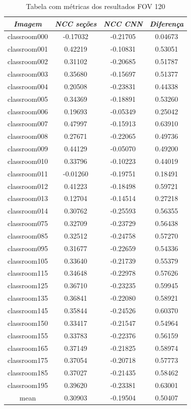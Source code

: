 \documentclass[cic,tc]{iiufrgs}
\begin{document}
\begin{table}[h]
    \caption{Tabela com métricas dos resultados FOV 120\degree}
    \centering
        \begin{tabular}{c|c|c|c}
          \hline
          \textit{Imagem} & \textit{NCC seções} & \textit{NCC CNN} & \textit{Diferença} \\
          \hline
          \hline
          classroom000 & -0.17032 & -0.21705 & 0.04673 \\
          classroom001 & 0.42219 & -0.10831 & 0.53051 \\
          classroom002 & 0.31102 & -0.20685 & 0.51787 \\
          classroom003 & 0.35680 & -0.15697 & 0.51377 \\
          classroom004 & 0.20508 & -0.23831 & 0.44338 \\
          classroom005 & 0.34369 & -0.18891 & 0.53260 \\
          classroom006 & 0.19693 & -0.05349 & 0.25042 \\
          classroom007 & 0.47997 & -0.15913 & 0.63910 \\
          classroom008 & 0.27671 & -0.22065 & 0.49736 \\
          classroom009 & 0.44129 & -0.05070 & 0.49200 \\
          classroom010 & 0.33796 & -0.10223 & 0.44019 \\
          classroom011 & -0.01260 & -0.19751 & 0.18491 \\
          classroom012 & 0.41223 & -0.18498 & 0.59721 \\
          classroom013 & 0.12704 & -0.14514 & 0.27218 \\
          classroom014 & 0.30762 & -0.25593 & 0.56355 \\
          classroom075 & 0.32709 & -0.23729 & 0.56438 \\
          classroom085 & 0.32512 & -0.24758 & 0.57270 \\
          classroom095 & 0.31677 & -0.22659 & 0.54336 \\
          classroom105 & 0.33640 & -0.21739 & 0.55379 \\
          classroom115 & 0.34648 & -0.22978 & 0.57626 \\
          classroom125 & 0.36710 & -0.23235 & 0.59945 \\
          classroom135 & 0.36841 & -0.22080 & 0.58921 \\
          classroom145 & 0.35844 & -0.24526 & 0.60370 \\
          classroom150 & 0.33417 & -0.21547 & 0.54964 \\
          classroom155 & 0.33783 & -0.22376 & 0.56159 \\
          classroom165 & 0.37149 & -0.21825 & 0.58974 \\
          classroom175 & 0.37054 & -0.20718 & 0.57773 \\
          classroom185 & 0.37027 & -0.21435 & 0.58462 \\
          classroom195 & 0.39620 & -0.23381 & 0.63001 \\
          \hline
          \hline
			mean & 0.30903 & -0.19504 & 0.50407 \\


\end{tabular}
\end{table}
\end{document}
